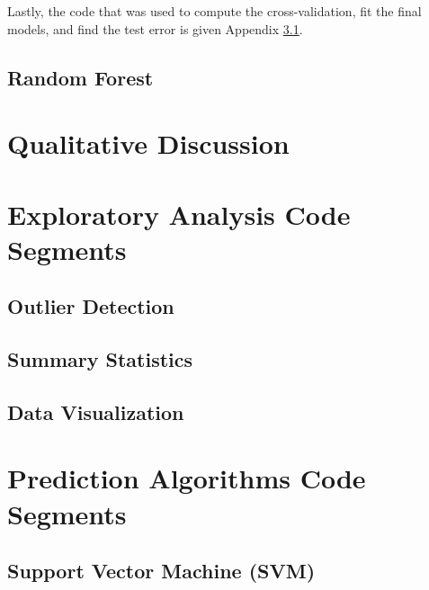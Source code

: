 \documentclass{article}
\begin{document}
    Lastly, the code that was used to compute the cross-validation, fit the final models, and find the test error is given  Appendix \ref{app:SVMCode}.
	

    \subsection{Random Forest}
    \hspace{\parindent} 

    
\section{Qualitative Discussion}
\hspace{\parindent} 

\appendix 

\section{Exploratory Analysis Code Segments}

\subsection{Outlier Detection}

\subsection{Summary Statistics}

\subsection{Data Visualization}

\section{Prediction Algorithms Code Segments}

\subsection{Support Vector Machine (SVM)} \label{app:SVMCode}
\end{document}
